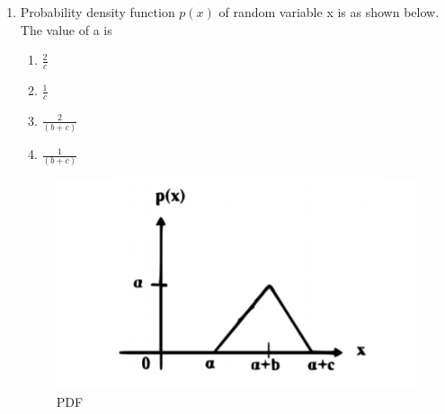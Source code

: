 \documentclass[journal,12pt,twocolumn]{IEEEtran}
\begin{document}
\begin{enumerate}
\item Probability density function $p(x)$ of random variable x is as shown below. The value of a is
\begin{enumerate}[label=\Alph*)]
    \item $\frac{2}{c}$
    \item $\frac{1}{c}$
    \item $\frac{2}{(b+c)}$
    \item $\frac{1}{(b+c)}$
\end{enumerate}
\begin{figure}[!ht]
\centering
\includegraphics[width=\columnwidth]{solutions/in/2006/2/figures/convolution.png}
\caption{PDF}
\label{in2006-2:fig:convolution}
\end{figure}
%
\solution


  


\end{enumerate}
\end{document}
